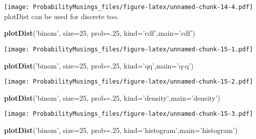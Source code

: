 \documentclass[]{article}
\newenvironment{Shaded}{\begin{snugshade}}{\end{snugshade}}
\newcommand{\KeywordTok}[1]{\textcolor[rgb]{0.13,0.29,0.53}{\textbf{#1}}}
\newcommand{\DataTypeTok}[1]{\textcolor[rgb]{0.13,0.29,0.53}{#1}}
\newcommand{\DecValTok}[1]{\textcolor[rgb]{0.00,0.00,0.81}{#1}}
\newcommand{\StringTok}[1]{\textcolor[rgb]{0.31,0.60,0.02}{#1}}
\newcommand{\NormalTok}[1]{#1}
\begin{document}
\texttt{[image: ProbabilityMusings\_files/figure-latex/unnamed-chunk-14-4.pdf]}
plotDist can be used for discrete too.

\begin{Shaded}
\begin{Highlighting}[]
\KeywordTok{plotDist}\NormalTok{(}\StringTok{'binom'}\NormalTok{, }\DataTypeTok{size=}\DecValTok{25}\NormalTok{, }\DataTypeTok{prob=}\NormalTok{.}\DecValTok{25}\NormalTok{, }\DataTypeTok{kind=}\StringTok{'cdf'}\NormalTok{,}\DataTypeTok{main=}\StringTok{'cdf'}\NormalTok{)}
\end{Highlighting}
\end{Shaded}

\texttt{[image: ProbabilityMusings\_files/figure-latex/unnamed-chunk-15-1.pdf]}

\begin{Shaded}
\begin{Highlighting}[]
\KeywordTok{plotDist}\NormalTok{(}\StringTok{'binom'}\NormalTok{, }\DataTypeTok{size=}\DecValTok{25}\NormalTok{, }\DataTypeTok{prob=}\NormalTok{.}\DecValTok{25}\NormalTok{, }\DataTypeTok{kind=}\StringTok{'qq'}\NormalTok{,}\DataTypeTok{main=}\StringTok{'q-q'}\NormalTok{)}
\end{Highlighting}
\end{Shaded}

\texttt{[image: ProbabilityMusings\_files/figure-latex/unnamed-chunk-15-2.pdf]}

\begin{Shaded}
\begin{Highlighting}[]
\KeywordTok{plotDist}\NormalTok{(}\StringTok{'binom'}\NormalTok{, }\DataTypeTok{size=}\DecValTok{25}\NormalTok{, }\DataTypeTok{prob=}\NormalTok{.}\DecValTok{25}\NormalTok{, }\DataTypeTok{kind=}\StringTok{'density'}\NormalTok{,}\DataTypeTok{main=}\StringTok{'density'}\NormalTok{)}
\end{Highlighting}
\end{Shaded}

\texttt{[image: ProbabilityMusings\_files/figure-latex/unnamed-chunk-15-3.pdf]}

\begin{Shaded}
\begin{Highlighting}[]
\KeywordTok{plotDist}\NormalTok{(}\StringTok{'binom'}\NormalTok{, }\DataTypeTok{size=}\DecValTok{25}\NormalTok{, }\DataTypeTok{prob=}\NormalTok{.}\DecValTok{25}\NormalTok{, }\DataTypeTok{kind=}\StringTok{'histogram'}\NormalTok{,}\DataTypeTok{main=}\StringTok{'histogram'}\NormalTok{)}
\end{Highlighting}
\end{Shaded}
\end{document}
